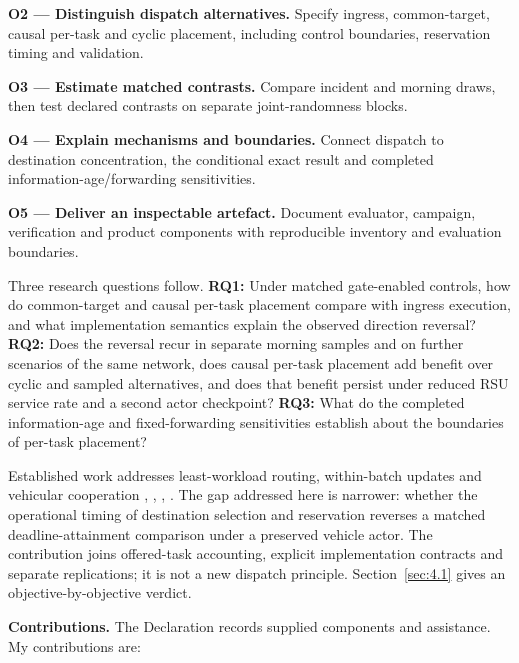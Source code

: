 \documentclass[12pt,a4paper]{article}
\begin{document}
\textbf{O2 --- Distinguish dispatch alternatives.} Specify ingress, common-target, causal per-task and cyclic placement, including control boundaries, reservation timing and validation.

\textbf{O3 --- Estimate matched contrasts.} Compare incident and morning draws, then test declared contrasts on separate joint-randomness blocks.

\textbf{O4 --- Explain mechanisms and boundaries.} Connect dispatch to destination concentration, the conditional exact result and completed information-age/forwarding sensitivities.

\textbf{O5 --- Deliver an inspectable artefact.} Document evaluator, campaign, verification and product components with reproducible inventory and evaluation boundaries.

Three research questions follow. \textbf{RQ1:} Under matched gate-enabled controls, how do common-target and causal per-task placement compare with ingress execution, and what implementation semantics explain the observed direction reversal? \textbf{RQ2:} Does the reversal recur in separate morning samples and on further scenarios of the same network, does causal per-task placement add benefit over cyclic and sampled alternatives, and does that benefit persist under reduced RSU service rate and a second actor checkpoint? \textbf{RQ3:} What do the completed information-age and fixed-forwarding sensitivities establish about the boundaries of per-task placement?

Established work addresses least-workload routing, within-batch updates and vehicular cooperation \cite{ref14}, \cite{ref16}, \cite{ref7}, \cite{ref8}. The gap addressed here is narrower: whether the operational timing of destination selection and reservation reverses a matched deadline-attainment comparison under a preserved vehicle actor. The contribution joins offered-task accounting, explicit implementation contracts and separate replications; it is not a new dispatch principle. Section~\ref{sec:4.1} gives an objective-by-objective verdict.

\textbf{Contributions.} The Declaration records supplied components and assistance. My contributions are:
\end{document}
